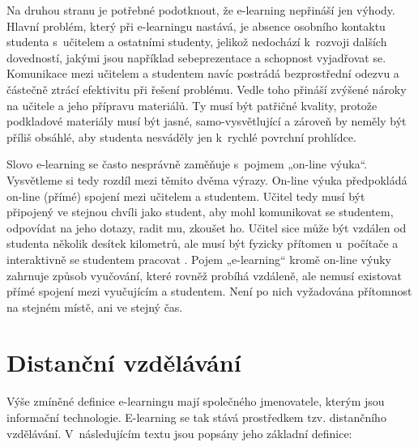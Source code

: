 \documentclass[
print,
  11pt,
  table,   
  nolof,    
  nolot,
  oneside,
  draft
]{fithesis3}
\begin{document}
Na druhou stranu je potřebné podotknout, že e-learning nepřináší jen výhody. Hlavní problém, který při e-learningu nastává, je absence osobního kontaktu studenta s~učitelem a ostatními studenty, jelikož nedochází k~rozvoji dalších dovedností, jakými jsou například sebeprezentace a schopnost vyjadřovat se. Komunikace mezi učitelem a studentem navíc postrádá bezprostřední odezvu a částečně ztrácí efektivitu při řešení problému. Vedle toho přináší zvýšené nároky na učitele a jeho přípravu materiálů. Ty musí být patřičné kvality, protože podkladové materiály musí být jasné, samo-vysvětlující a zároveň by neměly být příliš obsáhlé, aby studenta nesváděly jen k~rychlé povrchní prohlídce.

Slovo e-learning se často nesprávně zaměňuje s~pojmem „on-line výuka“. Vysvětleme si tedy rozdíl mezi těmito dvěma výrazy. On-line výuka předpokládá on-line (přímé) spojení mezi učitelem a studentem. Učitel tedy musí být připojený ve stejnou chvíli jako student, aby mohl komunikovat se studentem, odpovídat na jeho dotazy, radit mu, zkoušet ho. Učitel sice může být vzdálen od studenta několik desítek kilometrů, ale musí být fyzicky přítomen u~počítače a interaktivně se studentem pracovat \cite{striteska}. Pojem „e-learn\-ing“ kromě on-line výuky zahrnuje způsob vyučování, které rovněž probíhá vzdáleně, ale nemusí existovat přímé spojení mezi vyučujícím a studentem. Není po nich vyžadována přítomnost na stejném místě, ani ve stejný čas.


	\section{Distanční vzdělávání}

Výše zmíněné definice e-learningu mají společného jmenovatele, kterým jsou informační technologie. E-learning se tak stává prostředkem tzv. distančního vzdělávání. V~následujícím textu jsou popsány jeho základní definice: 
\end{document}
